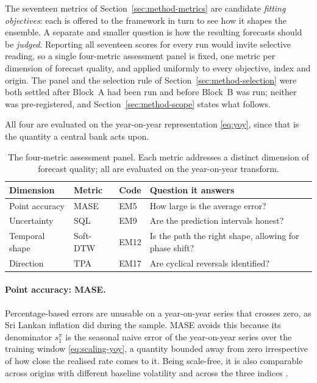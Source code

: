 \documentclass[12pt]{article}
\begin{document}
The seventeen metrics of Section~\ref{sec:method-metrics} are candidate
\emph{fitting objectives}: each is offered to the framework in turn to see how it
shapes the ensemble. A separate and smaller question is how the resulting
forecasts should be \emph{judged}. Reporting all seventeen scores for every run
would invite selective reading, so a single four-metric assessment panel is
fixed, one metric per dimension of forecast quality, and applied uniformly to
every objective, index and origin. The panel and the selection rule of
Section~\ref{sec:method-selection} were both settled after Block~A had been run
and before Block~B was run; neither was pre-registered, and
Section~\ref{sec:method-scope} states what follows.

All four are evaluated on the year-on-year representation \eqref{eq:yoy}, since
that is the quantity a central bank acts upon.

\begin{table}[htbp]
\centering
\caption{The four-metric assessment panel. Each metric addresses a distinct
dimension of forecast quality; all are evaluated on the year-on-year transform.}
\label{tab:panel}
\begin{tabular}{llll}
\toprule
Dimension & Metric & Code & Question it answers \\
\midrule
Point accuracy & MASE      & EM5  & How large is the average error? \\
Uncertainty    & SQL       & EM9  & Are the prediction intervals honest? \\
Temporal shape & Soft-DTW  & EM12 & Is the path the right shape, allowing for phase shift? \\
Direction      & TPA       & EM17 & Are cyclical reversals identified? \\
\bottomrule
\end{tabular}
\end{table}

\paragraph{Point accuracy: MASE.}
Percentage-based errors are unusable on a year-on-year series that crosses zero,
as Sri Lankan inflation did during the sample. MASE avoids this because its
denominator $s_1^{\pi}$ is the seasonal naive error of the year-on-year series
over the training window \eqref{eq:scaling-yoy}, a quantity bounded away from
zero irrespective of how close the realised rate comes to it. Being scale-free, it is also comparable across
origins with different baseline volatility and across the three indices
\citep{hyndman2006}.
\end{document}
